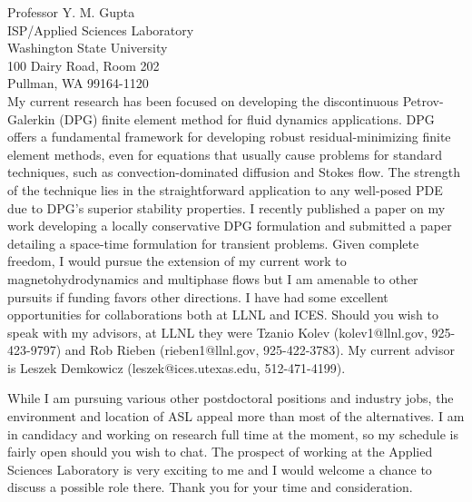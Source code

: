 \documentclass{letter} %
\begin{document}
\begin{letter}{
Professor Y. M. Gupta\\
ISP/Applied Sciences Laboratory\\
Washington State University\\
100 Dairy Road, Room 202\\
Pullman, WA 99164-1120\\
}
My current research has been focused on developing the discontinuous Petrov-Galerkin (DPG) finite element method for fluid dynamics applications.
DPG offers a fundamental framework for developing robust residual-minimizing finite element methods, even for equations that usually cause problems
for standard techniques, such as convection-dominated diffusion and Stokes flow.
The strength of the technique lies in the straightforward application to any well-posed PDE due to DPG's superior stability properties.
I recently published a paper on my work developing a locally conservative DPG formulation and submitted a paper detailing a space-time formulation
for transient problems.
Given complete freedom, I would pursue the extension of my current work to magnetohydrodynamics and multiphase flows 
but I am amenable to other pursuits if funding favors other directions.
I have had some excellent opportunities for collaborations both at LLNL and ICES. 
Should you wish to speak with my advisors, at LLNL they were Tzanio Kolev (kolev1@llnl.gov, 925-423-9797) and Rob Rieben (rieben1@llnl.gov, 925-422-3783).
My current advisor is Leszek Demkowicz (leszek@ices.utexas.edu, 512-471-4199).

While I am pursuing various other postdoctoral positions and industry jobs, the environment and location of ASL appeal 
more than most of the alternatives.
I am in candidacy and working on research full time at the moment, so my schedule is fairly open should you wish to chat.
The prospect of working at the Applied Sciences Laboratory is very exciting to me and I would welcome a chance to discuss a possible role there.
Thank you for your time and consideration.
 
 

\end{letter}
\end{document}
